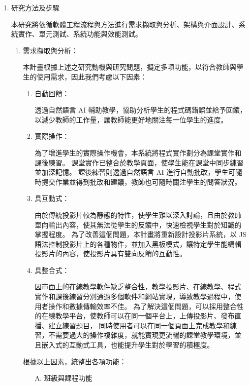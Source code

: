 \documentclass[12pt]{article}
\begin{document}
\begin{enumerate}
  \item 研究方法及步驟
    \par 本研究將依循軟體工程流程與方法進行需求擷取與分析、架構與介面設計、系統實作、單元測試、系統功能與效能測試。
    \begin{enumerate}
      \setlength{\parindent}{2em}
      \item 需求擷取與分析：
        \par 本計畫根據上述之研究動機與研究問題，擬定多項功能，以符合教師與學生的使用需求，因此我們考慮以下因素：
        \begin{enumerate}[label=(\arabic*)]
          \setlength{\parindent}{2em}
          \item 自動回饋：
            \par 透過自然語言 AI 輔助教學，協助分析學生的程式碼錯誤並給予回饋，以減少教師的工作量，讓教師能更好地關注每一位學生的進度。
          \item 實際操作：
            \par 為了增進學生的實際操作機會，本系統將程式實作劃分為課堂實作和課後練習。
            課堂實作已整合於教學頁面，使學生能在課堂中同步練習並加深記憶。
            課後練習則透過自然語言 AI 進行自動批改，學生可隨時提交作業並得到批改和建議，教師也可隨時關注學生的問答狀況。
          \item 具互動式：
            \par 由於傳統投影片較為靜態的特性，使學生難以深入討論，且由於教師單向輸出內容，使其無法從學生的反饋中，快速檢視學生對於知識的掌握程度。
            為了改善這個問題，本計畫將重新設計投影片系統，以 JS 語法控制投影片上的各種物件，並加入黑板模式，讓特定學生能編輯投影片的內容，使投影片具有雙向反饋的互動性。
          \item 具整合式：
            \par 因市面上的在線教學軟件缺乏整合性，教學投影片、在線教學、程式實作和課後練習分別通過多個軟件和網站實現，導致教學過程中，使用者操作和數據傳輸效率不佳。
            為了解決這個問題，可以採用整合性的在線教學平台，使教師可以在同一個平台上，上傳投影片、發布直播、建立練習題目，
            同時使用者可以在同一個頁面上完成教學和練習，不需要過大的操作複雜度，就能實現更流暢的課堂教學環境，並且嵌入式的互動式工具，也能提升學生對於學習的積極度\cite{ref18}。
        \end{enumerate}
      \par 根據以上因素，統整出各項功能：%
        \begin{enumerate}[itemindent=24pt]
          \item [A.] 班級與課程功能

\end{enumerate}
\end{enumerate}
\end{enumerate}
\end{document}
